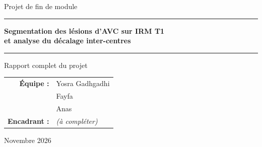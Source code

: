 \documentclass[11pt,a4paper]{report}
\begin{document}
\begin{titlepage}
  \centering
  \vspace*{1.5cm}
  {\Large Projet de fin de module \par}
  \vspace{1.5cm}
  \rule{\linewidth}{0.6pt}\par\vspace{0.4cm}
  {\huge\bfseries Segmentation des lésions d'AVC sur IRM T1\\[0.3cm]
   et analyse du décalage inter-centres \par}
  \vspace{0.4cm}\rule{\linewidth}{0.6pt}\par
  \vspace{1.5cm}
  {\large Rapport complet du projet \par}
  \vspace{2cm}
  {\large
  \begin{tabular}{rl}
    \textbf{Équipe :} & Yosra Gadhgadhi \\
                      & Fayfa \\
                      & Anas \\[0.4cm]
    \textbf{Encadrant :} & \textit{(à compléter)} \\
  \end{tabular}\par}
  \vfill
  {\large Novembre 2026 \par}
\end{titlepage}
\end{document}
